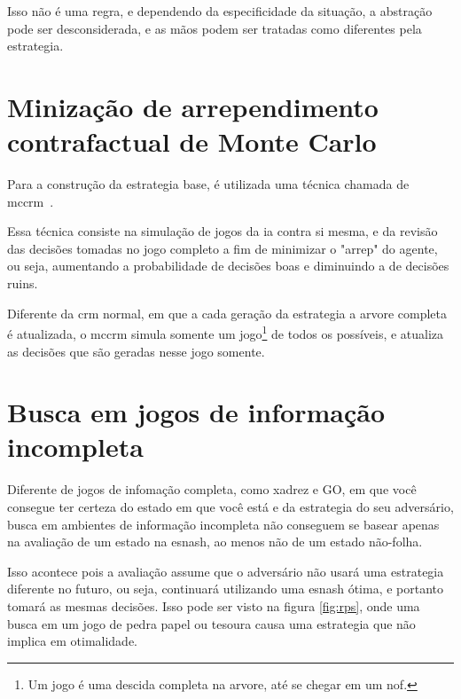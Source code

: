 \documentclass[twocolumn]{article}
\theoremstyle{mytheoremstyle}
\theoremstyle{mytheoremstyle}
\theoremstyle{myproblemstyle}
\begin{document}
            Isso não é uma regra, e dependendo da especificidade da situação, a abstração pode ser desconsiderada, e as mãos podem ser tratadas como
            diferentes pela \gls{estrategia}.



    \section{Minização de arrependimento contrafactual de Monte Carlo} %
    \label{sec:Minização de arrependimento contrafactual de Monte Carlo}
        Para a construção da \gls{estrategia} base, é utilizada uma técnica chamada de \acrfull{mccrm}~\cite{NIPS2009_00411460,brown2019solving}.

        Essa técnica consiste na simulação de jogos da \acrshort{ia} contra si mesma, e da revisão das decisões tomadas no jogo completo a fim de minimizar o "\gls{arrep}"
        do agente, ou seja, aumentando a probabilidade de decisões boas e diminuindo a de decisões ruins.

        Diferente da \acrshort{crm} normal, em que a cada geração da \gls{estrategia} a \gls{arvore} completa é atualizada, o \acrshort{mccrm} simula somente um jogo\footnote{Um jogo é uma descida
        completa na \gls{arvore}, até se chegar em um \gls{nof}.} de todos os possíveis, e atualiza as decisões que são geradas nesse jogo somente.


    \section{Busca em jogos de informação incompleta} %
    \label{sec:Busca em Jogos de informação incompleta}

        Diferente de jogos de infomação completa, como xadrez e GO, em que você consegue ter certeza do estado em que você está e da \gls{estrategia} do seu adversário,
        busca em ambientes de informação incompleta não conseguem se basear apenas na avaliação de um estado na \gls{esnash}, ao menos não de um estado não-folha.

        Isso acontece pois a avaliação assume que o adversário não usará uma \gls{estrategia} diferente no futuro, ou seja, continuará utilizando uma \gls{esnash}
        ótima, e portanto tomará as mesmas decisões. Isso pode ser visto na figura \ref{fig:rps}, onde uma busca em um jogo de pedra papel ou tesoura
        causa uma \gls{estrategia} que não implica em otimalidade.
\end{document}
